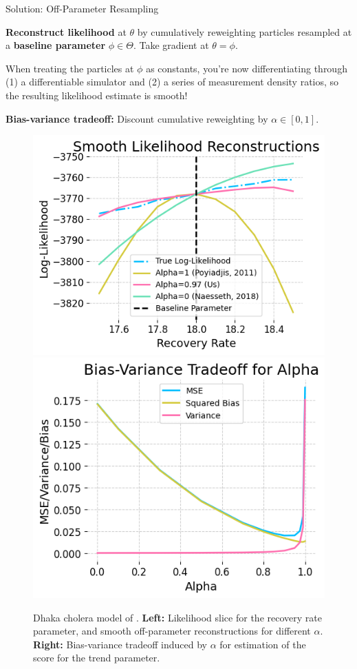 \documentclass[final]{beamer}
\newlength{\colwidth}
\begin{document}
\begin{frame}[t]
\begin{columns}[t]
\begin{column}{\colwidth}
  \begin{alertblock}{Solution: Off-Parameter Resampling}

    \textbf{Reconstruct likelihood} at $\theta$ by cumulatively reweighting particles resampled at a \textbf{baseline parameter} $\phi \in \Theta$. Take gradient at $\theta=\phi$.

    When treating the particles at $\phi$ as constants, you're now differentiating through (1) a differentiable simulator and (2) a series of measurement density ratios, so the resulting likelihood estimate is smooth!

    \textbf{Bias-variance tradeoff:} Discount cumulative reweighting by $\alpha \in [0,1]$.

  \end{alertblock}

  \vspace{-1ex}
    \begin{figure}
        \centering
        \includegraphics[width=0.45\linewidth]{imgs/095/mop.png}
        \includegraphics[width=0.405\linewidth]{imgs/095/biasvar.png}
        \caption{Dhaka cholera model of \cite{king08}. \textbf{Left:} Likelihood slice for the recovery rate parameter, and smooth off-parameter reconstructions for different $\alpha$. \textbf{Right:} Bias-variance tradeoff induced by $\alpha$ for estimation of the score for the trend parameter. }
        \label{fig:enter-label}
    \end{figure}
    


\end{column}
\end{columns}
\end{frame}
\end{document}
